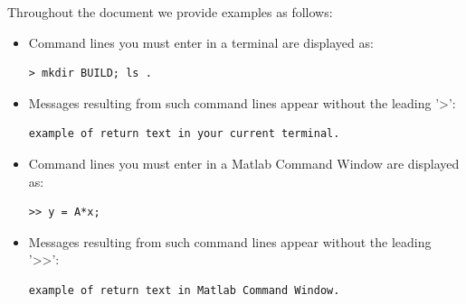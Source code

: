 Throughout the document we provide examples as follows:
\begin{itemize}
\item Command lines you must enter in a terminal are displayed as:
\lstset{style=customBash}
\begin{lstlisting}
> mkdir BUILD; ls . 
\end{lstlisting}
\item Messages resulting from such command lines appear without the leading '>':
\lstset{style=customBash}
\begin{lstlisting}
example of return text in your current terminal. 
\end{lstlisting}
\item Command lines you must enter in a Matlab Command Window are displayed as:
\lstset{style=customMatlab}
\begin{lstlisting}
>> y = A*x; 
\end{lstlisting}
\item Messages resulting from such command lines appear without the leading '>>':
\lstset{style=customMatlab}
\begin{lstlisting}
example of return text in Matlab Command Window. 
\end{lstlisting}
\end{itemize}


